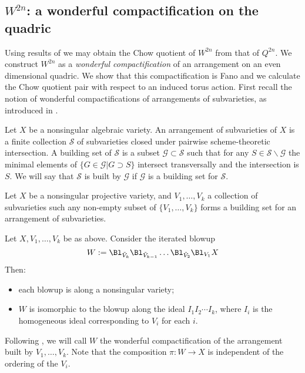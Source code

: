 \subsection{$W^{2n}$: a wonderful compactification on the quadric} \label{subsec:wonderful}
Using results of \cite{kirwan} we may obtain the Chow quotient of \(W^{2n}\) from that of \(Q^{2n}\). We construct \(W^{2n}\) as a \textit{wonderful compactification} of an arrangement on an even dimensional quadric. We show that this compactification is Fano and we calculate the Chow quotient pair with respect to an induced torus action. First recall the notion of wonderful compactifications of arrangements of subvarieties, as introduced in \cite{li06}.
\begin{definition}
Let \(X\) be a nonsingular algebraic variety. An arrangement of subvarieties of \(X\) is a finite collection \(\mathcal{S}\) of subvarieties closed under pairwise scheme-theoretic intersection. A building set of \(\mathcal{S}\) is a subset \(\mathcal{G} \subset \mathcal{S}\) such that for any \(S \in \mathcal{S} \backslash \mathcal{G}\) the minimal elements of \(\{G \in \mathcal{G} | G \supset S\}\) intersect transversally and the intersection is \(S\). We will say that \(\mathcal{S}\) is built by \(\mathcal{G}\) if \(\mathcal{G}\) is a building set for \(\mathcal{S}\).
\end{definition}
Let \(X\) be a nonsingular projective variety, and \(V_1,\dots,V_k\) a collection of subvarieties such any non-empty subset of \(\{V_1,\dots, V_k\}\) forms a building set for an arrangement of subvarieties.
\begin{theorem}[{\cite[Theorem 1.3]{li06}}] \label{thm:wonderful}
Let \(X,V_1,\dots,V_k\) be as above. Consider the iterated blowup
\[
W := \Bl_{\tilde{V}_k} \Bl_{\tilde{V}_{k-1}} \dots \Bl_{\tilde{V}_2} \Bl_{V_1} X
\]
Then:
\begin{itemize}
\item each blowup is along a nonsingular variety;
\item \(W\) is isomorphic to the blowup along the ideal \(I_1 I_2 \cdots I_k\), where \(I_i\) is the homogeneous ideal corresponding to \(V_i\) for each \(i\).
\end{itemize}
\end{theorem}
Following \cite{li06}, we will call \(W\) the wonderful compactification of the arrangement built by \(V_1,\dots,V_k\). Note that the composition \(\pi: W \to X\) is independent of the ordering of the \(V_i\).


